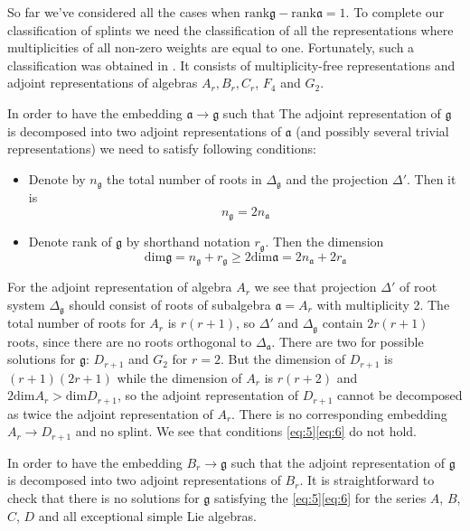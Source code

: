 \documentclass{article}
\newcommand{\gf}{\mathfrak{g}}
\newcommand{\af}{\mathfrak{a}}
\begin{document}
So far we've considered all the cases when $\mathrm{rank}\gf-\mathrm{rank}\af=1$. To complete our
classification of splints we need the classification of all the representations where multiplicities
of all non-zero weights are equal to one. Fortunately, such a classification was obtained in
\cite{plotkin1998visual}. It consists of multiplicity-free representations and adjoint
representations of algebras $A_{r}, B_{r}, C_{r}$, $F_{4}$ and $G_{2}$. 

In order to have the embedding $\af\to \gf$ such that The adjoint representation of $\gf$ is
decomposed into two adjoint representations of $\af$ (and possibly several trivial
representations) we need to satisfy following conditions:
\begin{itemize}
\item Denote by $n_{\gf}$ the total number of roots in $\Delta_{\gf}$ and the projection $\Delta'$.
  Then it is
  \begin{equation}
    \label{eq:5}
    n_{\gf}=2n_{\af}
  \end{equation}
\item Denote rank of $\gf$ by shorthand notation $r_{\gf}$. Then the dimension
  \begin{equation}
    \label{eq:6}
    \mathrm{dim}\gf=n_{\gf}+r_{\gf}\geq 2\mathrm{dim}\af=2n_{\af}+2r_{\af}
  \end{equation}

\end{itemize}


For the adjoint representation of algebra $A_{r}$ we see that projection $\Delta'$ of root system
$\Delta_{\gf}$ should consist of roots of subalgebra $\af=A_{r}$ with multiplicity 2. The total
number of roots for $A_{r}$ is $r(r+1)$, so $\Delta'$ and $\Delta_{\gf}$ contain $2r(r+1)$ roots,
since there are no roots orthogonal to $\Delta_{\af}$. There are two for possible solutions for
$\gf$: $D_{r+1}$ and $G_{2}$ for $r=2$. But the dimension of $D_{r+1}$ is $(r+1)(2r+1)$ while the
dimension of $A_{r}$ is $r(r+2)$ and $2\mathrm{dim}A_{r}>\mathrm{dim}D_{r+1}$, so the adjoint
representation of $D_{r+1}$ cannot be decomposed as twice the adjoint representation of $A_{r}$.
There is no corresponding embedding $A_{r}\to D_{r+1}$ and no splint. We see that conditions
\eqref{eq:5}\eqref{eq:6} do not hold. 

In order to have the embedding $B_{r}\to \gf$ such that the adjoint representation of $\gf$ is
decomposed into two adjoint representations of $B_{r}$. It is straightforward to check that there is
no solutions for $\gf$ satisfying the \eqref{eq:5}\eqref{eq:6} for the series $A$, $B$, $C$,
$D$ and all exceptional simple Lie algebras. 
\end{document}
